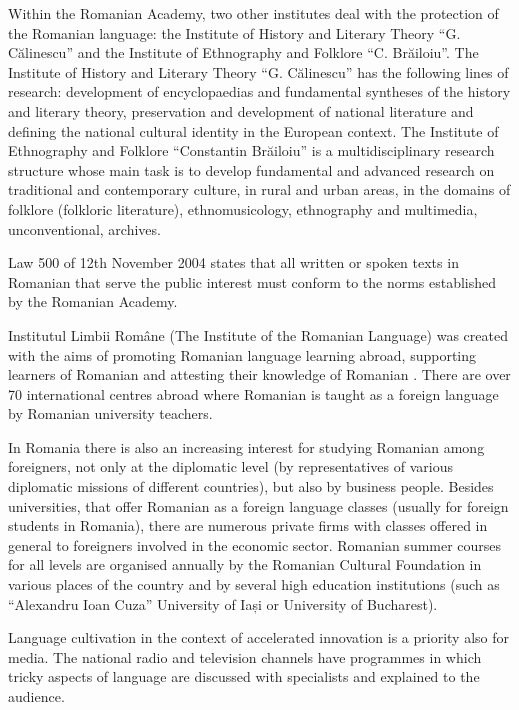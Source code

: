 \begin{multicols}{2}
Within the Romanian Academy, two other institutes deal with the protection of the Romanian language: the Institute of History and Literary Theory ``G. Călinescu'' and the Institute of Ethnography and Folklore ``C. Brăiloiu''. The Institute of History and Literary Theory ``G. Călinescu'' has the following lines of research: development of encyclopaedias and fundamental syntheses of the history and literary theory, preservation and development of national literature and defining the national cultural identity in the European context. The Institute of Ethnography and Folklore ``Constantin Brăiloiu'' is a multidisciplinary research structure whose main task is to develop fundamental and advanced research on traditional and contemporary culture, in rural and urban areas, in the domains of folklore (folkloric  literature), ethnomusicology, ethnography and multimedia, unconventional, archives.

Law 500 of 12th November 2004 states that all written or spoken texts in Romanian that serve the public interest must conform to the norms established by the Romanian Academy.


Institutul Limbii Române (The Institute of the Romanian Language) was created with the aims of promoting Romanian language learning abroad, supporting learners of Romanian and attesting their knowledge of Romanian \cite{urlILR}. There are over 70 international centres abroad where Romanian is taught as a foreign language by Romanian university teachers.

In Romania there is also an increasing interest for studying Romanian among foreigners, not only at the diplomatic level (by representatives of various diplomatic missions of different countries), but also by business people. Besides universities, that offer Romanian as a foreign language classes (usually for foreign students in Romania), there are numerous private firms with classes offered in general to foreigners involved in the economic sector. Romanian summer courses for all levels are organised annually by the Romanian Cultural Foundation in various places of the country and by several high education institutions (such as ``Alexandru Ioan Cuza'' University of Iași or University of Bucharest).

Language cultivation in the context of accelerated innovation is a priority also for media. The national radio and television channels have programmes in which tricky aspects of language are discussed with specialists and explained to the audience.


\end{multicols}
